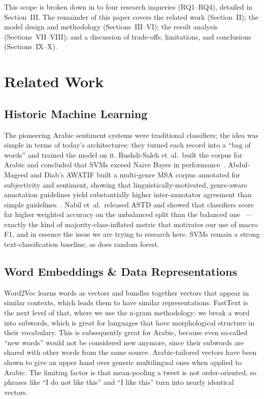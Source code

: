 \documentclass[conference]{IEEEtran}
\begin{document}
This scope is broken down in to four research inqueries (RQ1--RQ4), detailed in 
Section~III. The remainder of this paper covers the related work (Section~II);
the model design and methodology (Sections~III--VI); the result analysis (Sections~VII--VIII); and a discussion
of trade-offs, limitations, and conclusions (Sections~IX--X).


\section{Related Work}

\subsection{Historic Machine Learning}
The pioneering Arabic sentiment systems were traditional classifiers; the idea was
simple in terms of today's architectures: they turned each record into a ``bag of words'' and
trained the model on it. Rushdi-Saleh et~al.\ built the corpus for Arabic and concluded that SVMs
exceed Naive Bayes in performance~\cite{rushdi2011oca}. Abdul-Mageed and Diab's AWATIF
built a multi-genre MSA corpus annotated for subjectivity and sentiment, showing that
linguistically-motivated, genre-aware annotation guidelines yield substantially higher
inter-annotator agreement than simple guidelines~\cite{abdulmageed2012awatif}.
Nabil et~al.\ released ASTD and showed that classifiers score far higher weighted accuracy
on the unbalanced split than the balanced one~\cite{nabil2015astd} --- exactly the kind of
majority-class-inflated metric that motivates our use of macro F1, and in essence the issue
we are trying to research here. SVMs remain a strong text-classification baseline, as does
random forest.

\subsection{Word Embeddings \& Data Representations}
Word2Vec learns words as vectors and bundles together vectors that appear in similar contexts,
which leads them to have similar representations. FastText is the next level of
that, where we use the n-gram methodology: we break a word into subwords, which is great for languages
that have morphological structure in their vocabulary. This is subsequently great for Arabic,
because even so-called ``new words'' would not be considered new anymore, since their subwords are
shared with other words from the same source. Arabic-tailored
vectors have been shown to give an upper hand over generic multilingual ones when applied to Arabic.
The limiting factor is that mean-pooling a tweet is not order-oriented, so phrases like
``I do not like this'' and ``I like this'' turn into nearly identical vectors.
\end{document}
